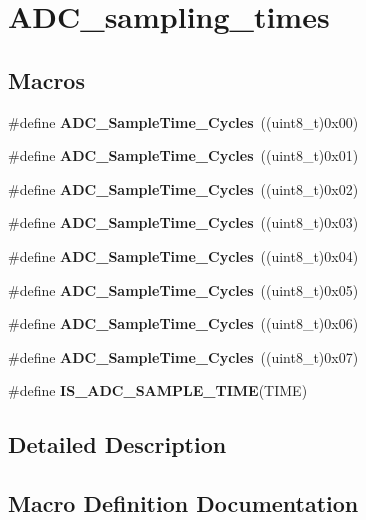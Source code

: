 \section{A\+D\+C\+\_\+sampling\+\_\+times}
\label{group__ADC__sampling__times}
\subsection*{Macros}
\begin{DoxyCompactItemize}
\item 
\#define \textbf{ A\+D\+C\+\_\+\+Sample\+Time\+\_\+Cycles}~((uint8\+\_\+t)0x00)
\item 
\#define \textbf{ A\+D\+C\+\_\+\+Sample\+Time\+\_\+Cycles}~((uint8\+\_\+t)0x01)
\item 
\#define \textbf{ A\+D\+C\+\_\+\+Sample\+Time\+\_\+Cycles}~((uint8\+\_\+t)0x02)
\item 
\#define \textbf{ A\+D\+C\+\_\+\+Sample\+Time\+\_\+Cycles}~((uint8\+\_\+t)0x03)
\item 
\#define \textbf{ A\+D\+C\+\_\+\+Sample\+Time\+\_\+Cycles}~((uint8\+\_\+t)0x04)
\item 
\#define \textbf{ A\+D\+C\+\_\+\+Sample\+Time\+\_\+Cycles}~((uint8\+\_\+t)0x05)
\item 
\#define \textbf{ A\+D\+C\+\_\+\+Sample\+Time\+\_\+Cycles}~((uint8\+\_\+t)0x06)
\item 
\#define \textbf{ A\+D\+C\+\_\+\+Sample\+Time\+\_\+Cycles}~((uint8\+\_\+t)0x07)
\item 
\#define \textbf{ I\+S\+\_\+\+A\+D\+C\+\_\+\+S\+A\+M\+P\+L\+E\+\_\+\+T\+I\+ME}(T\+I\+ME)
\end{DoxyCompactItemize}


\subsection{Detailed Description}


\subsection{Macro Definition Documentation}
\mbox{\label{group__ADC__sampling__times_ga1b98913dec7a22c54f0749ce254f9796}} 
